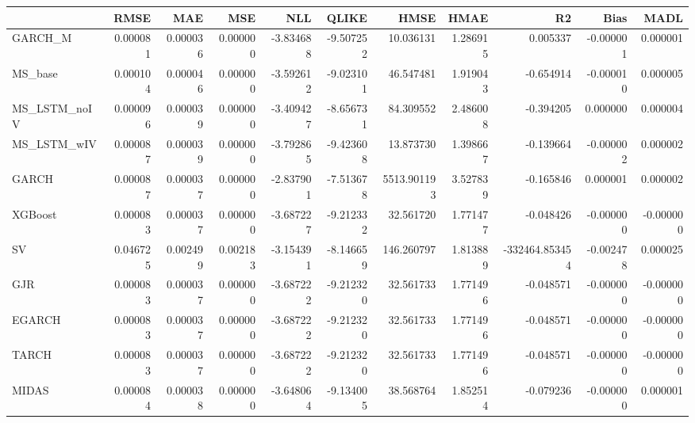 \begin{tabular}{lrrrrrrrrrr}
\toprule
 & RMSE & MAE & MSE & NLL & QLIKE & HMSE & HMAE & R2 & Bias & MADL \\
\midrule
GARCH_M & 0.000081 & 0.000036 & 0.000000 & -3.834688 & -9.507252 & 10.036131 & 1.286915 & 0.005337 & -0.000001 & 0.000001 \\
MS_base & 0.000104 & 0.000046 & 0.000000 & -3.592612 & -9.023101 & 46.547481 & 1.919043 & -0.654914 & -0.000010 & 0.000005 \\
MS_LSTM_noIV & 0.000096 & 0.000039 & 0.000000 & -3.409427 & -8.656731 & 84.309552 & 2.486008 & -0.394205 & 0.000000 & 0.000004 \\
MS_LSTM_wIV & 0.000087 & 0.000039 & 0.000000 & -3.792865 & -9.423608 & 13.873730 & 1.398667 & -0.139664 & -0.000002 & 0.000002 \\
GARCH & 0.000087 & 0.000037 & 0.000000 & -2.837901 & -7.513678 & 5513.901193 & 3.527839 & -0.165846 & 0.000001 & 0.000002 \\
XGBoost & 0.000083 & 0.000037 & 0.000000 & -3.687227 & -9.212332 & 32.561720 & 1.771477 & -0.048426 & -0.000000 & -0.000000 \\
SV & 0.046725 & 0.002499 & 0.002183 & -3.154391 & -8.146659 & 146.260797 & 1.813889 & -332464.853454 & -0.002478 & 0.000025 \\
GJR & 0.000083 & 0.000037 & 0.000000 & -3.687222 & -9.212320 & 32.561733 & 1.771496 & -0.048571 & -0.000000 & -0.000000 \\
EGARCH & 0.000083 & 0.000037 & 0.000000 & -3.687222 & -9.212320 & 32.561733 & 1.771496 & -0.048571 & -0.000000 & -0.000000 \\
TARCH & 0.000083 & 0.000037 & 0.000000 & -3.687222 & -9.212320 & 32.561733 & 1.771496 & -0.048571 & -0.000000 & -0.000000 \\
MIDAS & 0.000084 & 0.000038 & 0.000000 & -3.648064 & -9.134005 & 38.568764 & 1.852514 & -0.079236 & -0.000000 & 0.000001 \\
\bottomrule
\end{tabular}
